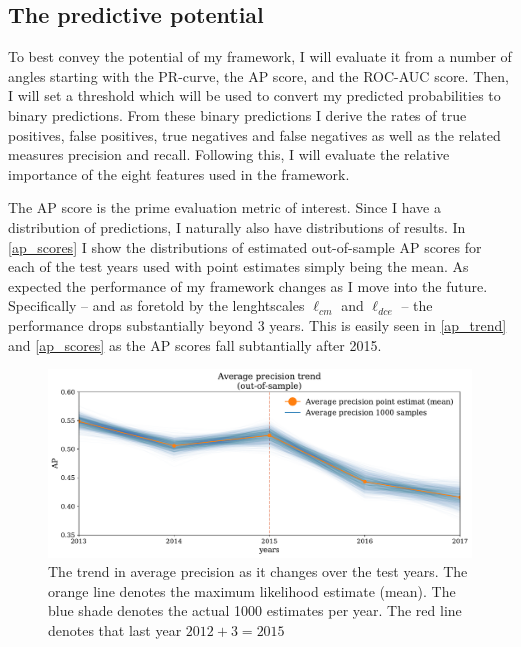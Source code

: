 \documentclass[a4paper]{article}
\begin{document}



\subsection{The predictive potential}

To best convey the potential of my framework, I will evaluate it from a number of angles starting with the PR-curve, the AP score, and the ROC-AUC score. Then, I will set a threshold which will be used to convert my predicted probabilities to binary predictions. From these binary predictions I derive the rates of true positives, false positives, true negatives and false negatives as well as the related measures precision and recall. Following this, I will evaluate the relative importance of the eight features used in the framework.\par

The AP score is the prime evaluation metric of interest. Since I have a distribution of predictions, I naturally also have distributions of results. In \autoref{ap_scores} I show the distributions of estimated out-of-sample AP scores for each of the test years used with point estimates simply being the mean. As expected the performance of my framework changes as I move into the future. Specifically -- and as foretold by the lenghtscales $\ell_{cm}$ and $\ell_{dce}$ -- the performance drops substantially beyond 3 years. This is easily seen in \autoref{ap_trend} and \autoref{ap_scores} as the AP scores fall subtantially after 2015.\par

\begin{figure}[!htb]
	\centering
	\includegraphics[scale=0.47]{ap_trend_alt.pdf}
    \caption{\footnotesize{The trend in average precision as it changes over the test years. The orange line denotes the maximum likelihood estimate (mean). The blue shade denotes the actual 1000 estimates per year. The red line denotes that last year $2012+3=2015$}}\label{ap_trend}
\end{figure}
\end{document}
